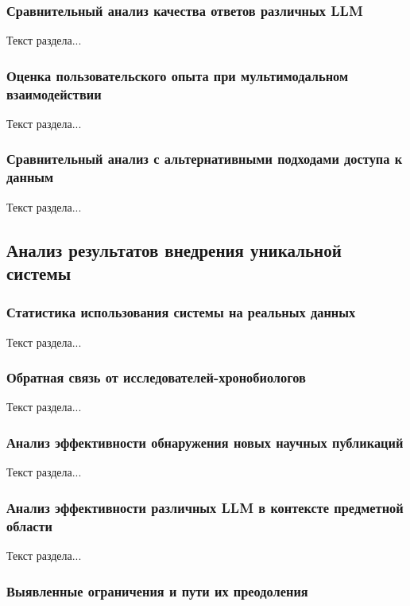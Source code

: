 \subsubsection{Сравнительный анализ качества ответов различных LLM}

Текст раздела...

\subsubsection{Оценка пользовательского опыта при мультимодальном взаимодействии}

Текст раздела...

\subsubsection{Сравнительный анализ с альтернативными подходами доступа к данным}

Текст раздела...

\subsection{Анализ результатов внедрения уникальной системы}

\subsubsection{Статистика использования системы на реальных данных}

Текст раздела...

\subsubsection{Обратная связь от исследователей-хронобиологов}

Текст раздела...

\subsubsection{Анализ эффективности обнаружения новых научных публикаций}

Текст раздела...

\subsubsection{Анализ эффективности различных LLM в контексте предметной области}

Текст раздела...

\subsubsection{Выявленные ограничения и пути их преодоления}

